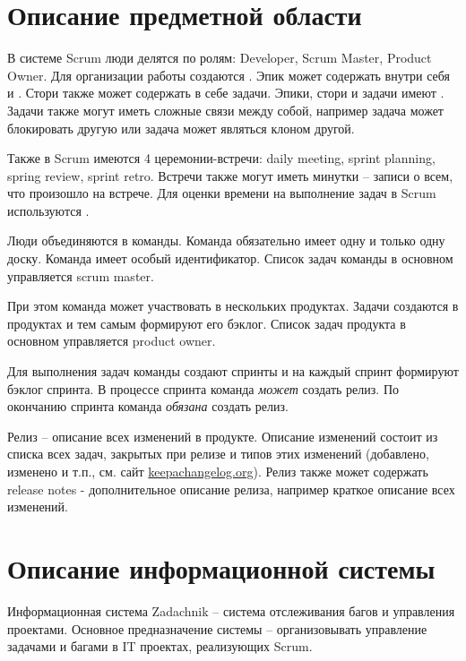 \documentclass[14pt,a4paper]{extarticle}
\begin{document}

\tableofcontents

\section{Описание предметной области}
В системе Scrum люди делятся по ролям:
Developer, Scrum Master, Product Owner.
Для организации работы создаются .
Эпик может содержать внутри себя  и
. Стори также может содержать в себе задачи.
Эпики, стори и задачи имеют .
Задачи также могут иметь сложные связи между собой, например
задача может блокировать другую или задача может являться клоном другой.

Также в Scrum имеются 4 церемонии-встречи: daily meeting, sprint
planning, spring review, sprint retro.
Встречи также могут иметь минутки -- записи о всем, что произошло на встрече.
Для оценки времени на выполнение задач в Scrum используются .

Люди объединяются в команды. Команда обязательно имеет одну и только одну доску.
Команда имеет особый идентификатор.
Список задач команды в основном управляется scrum master.

При этом команда может участвовать в нескольких продуктах.
Задачи создаются в продуктах и тем самым формируют его бэклог.
Список задач продукта в основном управляется product owner.

Для выполнения задач команды создают спринты и на каждый
спринт формируют бэклог спринта.
В процессе спринта команда \emph{может} создать релиз.
По окончанию спринта команда \emph{обязана} создать релиз.

Релиз -- описание всех изменений в продукте.
Описание изменений состоит из списка всех задач,
закрытых при релизе и типов этих изменений (добавлено, изменено и т.п., см. сайт \url{keepachangelog.org}).
Релиз также может содержать release notes - дополнительное описание релиза, например
краткое описание всех изменений.

\section{Описание информационной системы}
Информационная система Zadachnik -- система отслеживания багов и
управления проектами.
Основное предназначение системы -- организовывать управление задачами и багами
в IT проектах, реализующих Scrum.
\end{document}
